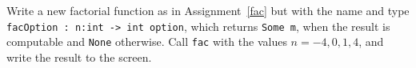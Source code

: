 Write a new factorial function as in Assignment~\ref{fac} but with the name and type \lstinline{facOption : n:int -> int option}, which returns \lstinline{Some m}, when the result is computable and \lstinline{None} otherwise. Call \lstinline{fac} with the values $n=-4,0,1,4$, and write the result to the screen.